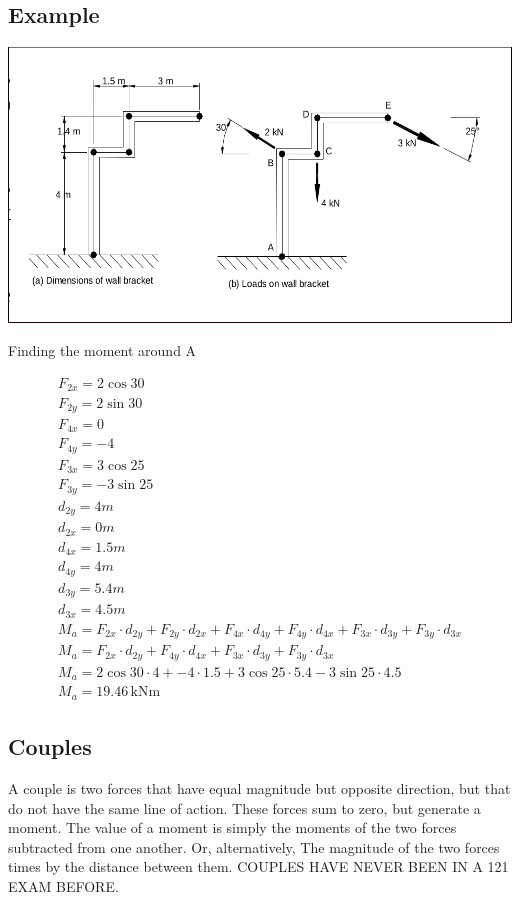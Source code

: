 \documentclass[a4paper, 12pt]{article}
\newcommand{\unit}[1]{\ensuremath{\, \mathrm{#1}}}
\begin{document}
\subsection{Example}
\begin{center}
\includegraphics[scale=0.2]{topic-3}

Finding the moment around A
\end{center}
\begin{gather*}
    F_{2x} = 2\cos{30} \\ 
    F_{2y} = 2\sin{30} \\
    F_{4x} = 0 \\ 
    F_{4y} = -4 \\
    F_{3x} = 3\cos{25} \\
    F_{3y} = -3\sin{25} \\
    d_{2y} = 4m \\
    d_{2x} = 0m \\
    d_{4x} = 1.5m \\
    d_{4y} = 4m \\
    d_{3y} = 5.4m \\
    d_{3x} = 4.5m \\
    M_a = F_{2x} \cdot d_{2y} + F_{2y} \cdot d_{2x} + F_{4x} \cdot d_{4y} + F_{4y} \cdot d_{4x} + F_{3x} \cdot d_{3y} + F_{3y} \cdot d_{3x} \\
    M_a = F_{2x} \cdot d_{2y} + F_{4y} \cdot d_{4x} + F_{3x} \cdot d_{3y} + F_{3y} \cdot d_{3x} \\
    M_a = 2\cos{30} \cdot 4 + -4 \cdot 1.5 + 3\cos{25} \cdot 5.4 - 3\sin{25} \cdot 4.5 \\ 
    M_a = 19.46 \unit{kNm}
\end{gather*}
\subsection{Couples}
A couple is two forces that have equal magnitude but opposite direction, but that do not have the same line of action.
These forces sum to zero, but generate a moment. The value of a moment is simply the moments of the two forces subtracted from one another.
Or, alternatively, The magnitude of the two forces times by the distance between them.
COUPLES HAVE NEVER BEEN IN A 121 EXAM BEFORE.
\end{document}
